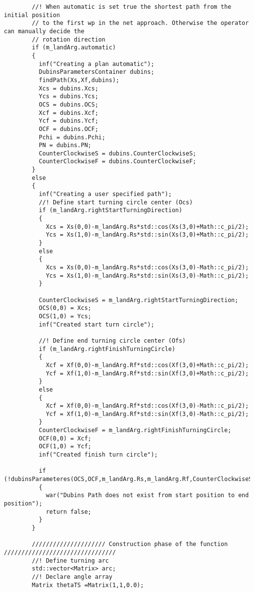 \begin{frame}[fragile]
\begin{lstlisting}
        //! When automatic is set true the shortest path from the initial position
        // to the first wp in the net approach. Otherwise the operator can manually decide the
        // rotation direction
        if (m_landArg.automatic)
        {
          inf("Creating a plan automatic");
          DubinsParametersContainer dubins;
          findPath(Xs,Xf,dubins);
          Xcs = dubins.Xcs;
          Ycs = dubins.Ycs;
          OCS = dubins.OCS;
          Xcf = dubins.Xcf;
          Ycf = dubins.Ycf;
          OCF = dubins.OCF;
          Pchi = dubins.Pchi;
          PN = dubins.PN;
          CounterClockwiseS = dubins.CounterClockwiseS;
          CounterClockwiseF = dubins.CounterClockwiseF;
        }
        else
        {
          inf("Creating a user specified path");
          //! Define start turning circle center (Ocs)
          if (m_landArg.rightStartTurningDirection)
          {
            Xcs = Xs(0,0)-m_landArg.Rs*std::cos(Xs(3,0)+Math::c_pi/2);
            Ycs = Xs(1,0)-m_landArg.Rs*std::sin(Xs(3,0)+Math::c_pi/2);
          }
          else
          {
            Xcs = Xs(0,0)-m_landArg.Rs*std::cos(Xs(3,0)-Math::c_pi/2);
            Ycs = Xs(1,0)-m_landArg.Rs*std::sin(Xs(3,0)-Math::c_pi/2);
          }

          CounterClockwiseS = m_landArg.rightStartTurningDirection;
          OCS(0,0) = Xcs;
          OCS(1,0) = Ycs;
          inf("Created start turn circle");

          //! Define end turning circle center (Ofs)
          if (m_landArg.rightFinishTurningCircle)
          {
            Xcf = Xf(0,0)-m_landArg.Rf*std::cos(Xf(3,0)+Math::c_pi/2);
            Ycf = Xf(1,0)-m_landArg.Rf*std::sin(Xf(3,0)+Math::c_pi/2);
          }
          else
          {
            Xcf = Xf(0,0)-m_landArg.Rf*std::cos(Xf(3,0)-Math::c_pi/2);
            Ycf = Xf(1,0)-m_landArg.Rf*std::sin(Xf(3,0)-Math::c_pi/2);
          }
          CounterClockwiseF = m_landArg.rightFinishTurningCircle;
          OCF(0,0) = Xcf;
          OCF(1,0) = Ycf;
          inf("Created finish turn circle");

          if (!dubinsParameteres(OCS,OCF,m_landArg.Rs,m_landArg.Rf,CounterClockwiseS,CounterClockwiseF,Pchi,PN))
          {
            war("Dubins Path does not exist from start position to end position");
            return false;
          }
        }

        ///////////////////// Construction phase of the function ////////////////////////////////
        //! Define turning arc
        std::vector<Matrix> arc;
        //! Declare angle array
        Matrix thetaTS =Matrix(1,1,0.0);


\end{lstlisting}
\end{frame}
